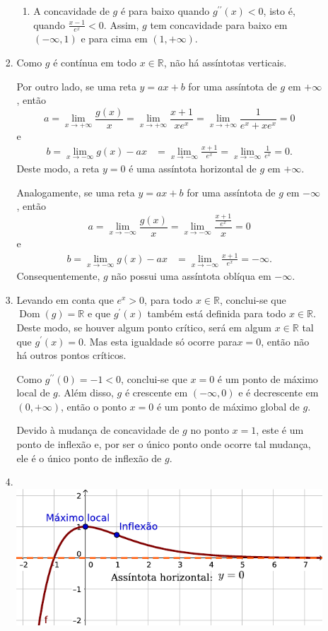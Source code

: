\documentclass[12pt,a4paper]{article}
\newcommand*\dom[1]{\operatorname{Dom}\left(#1\right)}
\newcommand*\R{\mathbb{R}}
\begin{document}
\begin{enumerate}
\begin{itemize}
\begin{enumerate}
\begin{enumerate}
\item A concavidade de $g$ é para baixo quando $g^{\prime\prime}(x) < 0$, isto é, quando $\frac{x-1}{e^x} < 0$. Assim, $g$ tem concavidade para baixo em $(-\infty, 1)$ e para cima em $(1, +\infty)$.
\end{enumerate}
\item
Como $g$ é contínua em todo $x \in \R$, não há assíntotas verticais.

Por outro lado, se uma reta $y = ax + b$ for uma assíntota de $g$ em $+\infty$, então
\[
a = \lim_{x \to +\infty} \frac{g(x)}{x}
= \lim_{x \to +\infty} \frac{x+1}{xe^x}
= \lim_{x \to +\infty} \dfrac{1}{e^x + xe^x}
= 0
\]
e
\begin{align*}
b = \lim_{x \to -\infty} g(x) - ax
& = \lim_{x \to -\infty} \frac{x+1}{e^x}
= \lim_{x \to -\infty} \frac{1}{e^x}
= 0.
\end{align*}
Deste modo, a reta $y=0$ é uma assíntota horizontal de $g$ em $+\infty$.

Analogamente, se uma reta $y = ax + b$ for uma assíntota de $g$ em $-\infty$, então
\[
a = \lim_{x \to -\infty} \frac{g(x)}{x}
= \lim_{x \to -\infty} \frac{\frac{x+1}{e^x}}{x}
= 0
\]
e
\begin{align*}
b = \lim_{x \to -\infty} g(x) - ax
& = \lim_{x \to -\infty} \frac{x+1}{e^x}
= -\infty.
\end{align*}
Consequentemente, $g$ não possui uma assíntota oblíqua em $-\infty$.

\item Levando em conta que $e^x > 0$, para todo $x \in \R$, conclui-se que $\dom{g} = \R$ e que $g^\prime(x)$ também está definida para todo $x \in \R$. Deste modo, se houver algum ponto crítico, será em algum $x \in \R$ tal que $g^\prime(x) = 0$. Mas esta igualdade só ocorre para$x = 0$, então não há outros pontos críticos.

Como $g^{\prime\prime}(0) = -1 < 0$, conclui-se que $x=0$ é um ponto de máximo local de $g$. Além disso, $g$ é crescente em $(-\infty,0)$ e é decrescente em $(0, +\infty)$, então o ponto $x=0$ é um ponto de máximo global de $g$.

Devido à mudança de concavidade de $g$ no ponto $x = 1$, este é um ponto de inflexão e, por ser o único ponto onde ocorre tal mudança, ele é o único ponto de inflexão de $g$.

\item  \text{}\\
\includegraphics[width=0.78\linewidth]{img/prova-3-tads-2b-quociente-lin-exp}
\end{enumerate}
\end{itemize}


\end{enumerate}
\end{document}
